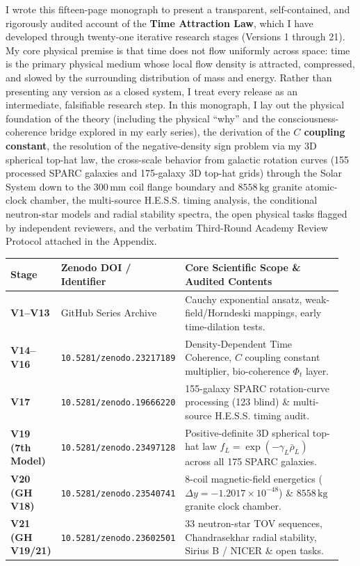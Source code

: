 \documentclass[10pt,a4paper]{article}
\begin{document}
{\small{}\par
I wrote this fifteen-page monograph to present a transparent, self-contained, and rigorously audited account of the \textbf{Time Attraction Law}, which I have developed through twenty-one iterative research stages (Versions 1 through 21). My core physical premise is that time does not flow uniformly across space: time is the primary physical medium whose local flow density is attracted, compressed, and slowed by the surrounding distribution of mass and energy. Rather than presenting any version as a closed system, I treat every release as an intermediate, falsifiable research step. In this monograph, I lay out the physical foundation of the theory (including the physical ``why'' and the consciousness-coherence bridge explored in my early series), the derivation of the \textbf{$C$ coupling constant}, the resolution of the negative-density sign problem via my 3D spherical top-hat law, the cross-scale behavior from galactic rotation curves (155 processed SPARC galaxies and 175-galaxy 3D top-hat grids) through the Solar System down to the $300\,\text{mm}$ coil flange boundary and $8558\,\text{kg}$ granite atomic-clock chamber, the multi-source H.E.S.S. timing analysis, the conditional neutron-star models and radial stability spectra, the open physical tasks flagged by independent reviewers, and the verbatim Third-Round Academy Review Protocol attached in the Appendix.

\vspace{1.5mm}
\begin{center}\vspace{-2pt}
{\footnotesize
\begin{tabular}{@{}>{\bfseries}p{0.15\linewidth}p{0.27\linewidth}p{0.53\linewidth}@{}}
\toprule
Stage & Zenodo DOI / Identifier & Core Scientific Scope \& Audited Contents \\
\midrule
V1--V13 & GitHub Series Archive & Cauchy exponential ansatz, weak-field/Horndeski mappings, early time-dilation tests. \\
V14--V16 & \texttt{10.5281/zenodo.23217189} & Density-Dependent Time Coherence, $C$ coupling constant multiplier, bio-coherence $\Phi_t$ layer. \\
V17 & \texttt{10.5281/zenodo.19666220} & 155-galaxy SPARC rotation-curve processing (123 blind) \& multi-source H.E.S.S. timing audit. \\
V19 (7th Model) & \texttt{10.5281/zenodo.23497128} & Positive-definite 3D spherical top-hat law $f_L=\exp(-\gamma_L\bar{\rho}_L)$ across all 175 SPARC galaxies. \\
V20 (GH V18) & \texttt{10.5281/zenodo.23540741} & 8-coil magnetic-field energetics ($\Delta y=-1.2017\times 10^{-48}$) \& $8558\,\text{kg}$ granite clock chamber. \\
V21 (GH V19/21) & \texttt{10.5281/zenodo.23602501} & 33 neutron-star TOV sequences, Chandrasekhar radial stability, Sirius B / NICER \& open tasks. \\
\bottomrule
\end{tabular}}
\end{center}

}
\end{document}

